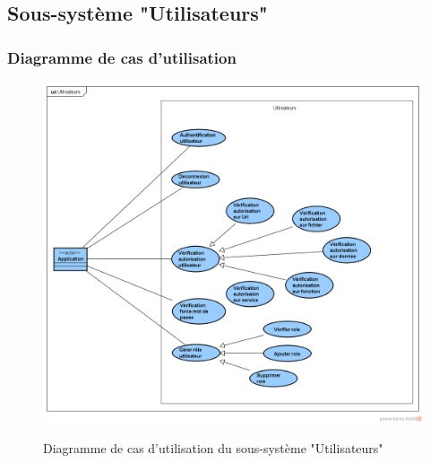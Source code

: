 \subsection{Sous-système "Utilisateurs"}

\subsubsection{Diagramme de cas d'utilisation}
\begin{figure}[H]
	\centering
	\begin{minipage}{12cm}
		\centering
		{\includegraphics[height=0.35\textheight, width=1\textwidth]{fig/Utilisateurs-use-case-diagram.png}}
	\end{minipage}
	\caption{Diagramme de cas d'utilisation du sous-système "Utilisateurs"}
	\label{fig:7.13}
\end{figure}

